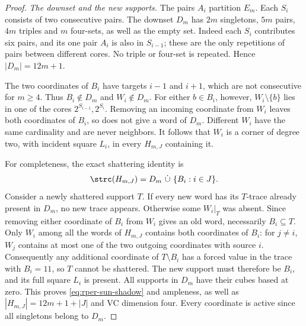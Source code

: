 \begin{proof}
\emph{The downset and the new supports.}
The pairs $A_i$ partition $E_m$. Each $S_i$ consists of two consecutive
pairs. The downset $D_m$ has $2m$ singletons, $5m$ pairs, $4m$ triples
and $m$ four-sets, as well as the empty set. Indeed each $S_i$ contributes
six pairs, and its one pair $A_i$ is also in $S_{i-1}$; these are the
only repetitions of pairs between different cores. No triple or four-set
is repeated. Hence $|D_m|=12m+1$.

The two coordinates of $B_i$ have targets $i-1$ and $i+1$, which are not
consecutive for $m\ge4$. Thus $B_i\notin D_m$ and $W_i\notin D_m$.
For either $b\in B_i$, however, $W_i\setminus\{b\}$ lies in one of the
cores $2^{S_{i-1}},2^{S_i}$. Removing an incoming coordinate from $W_i$
leaves both coordinates of $B_i$, so does not give a word of $D_m$.
Different $W_i$ have the same cardinality and are never neighbors.
It follows that $W_i$ is a corner of degree two, with incident square
$L_i$, in every $H_{m,J}$ containing it.

For completeness, the exact shattering identity is
\begin{equation}
 \strc(H_{m,J})=D_m\ \dot\cup\ \{B_i:i\in J\}.
 \label{eq:rper-sun-shadow}
\end{equation}
Consider a newly shattered support $T$. If every new word has its
$T$-trace already present in $D_m$, no new trace appears. Otherwise some
$W_i|_T$ was absent. Since removing either coordinate of $B_i$ from
$W_i$ gives an old word, necessarily $B_i\subseteq T$.
Only $W_i$ among all the words of $H_{m,J}$ contains both coordinates
of $B_i$: for $j\ne i$, $W_j$ contains at most one of the two outgoing
coordinates with source $i$. Consequently any additional coordinate
of $T\setminus B_i$ has a forced value in the trace with $B_i=11$,
so $T$ cannot be shattered. The new support must therefore be $B_i$,
and its full square $L_i$ is present. All supports in $D_m$ have their
cubes based at zero. This proves \eqref{eq:rper-sun-shadow} and ampleness,
as well as $|H_{m,J}|=12m+1+|J|$ and VC dimension four.
Every coordinate is active since all singletons belong to $D_m$.


\end{proof}
